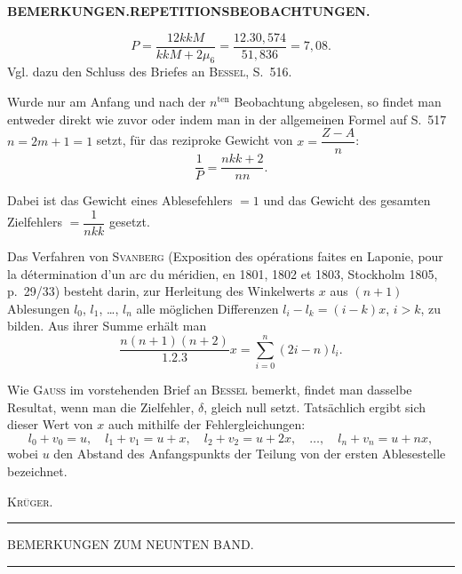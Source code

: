 \par\clearpage
\noindent{}\hfill{\small\textbf{BEMERKUNGEN.\quad REPETITIONSBEOBACHTUNGEN.}}\hfill\null\par\medskip
\[
 P=\frac{12kkM}{kkM+2\mu_6}=\frac{12.30{,}574}{51{,}836}=7{,}08.
\]
\indent Vgl. dazu den Schluss des Briefes an \textsc{Bessel}, S.~516.

Wurde nur am Anfang und nach der $n^{\text{ten}}$ Beobachtung abgelesen, so findet man entweder direkt wie zuvor oder indem man in der allgemeinen Formel auf S.~517 $n=2m+1=1$ setzt, für das reziproke Gewicht von $x=\dfrac{Z-A}{n}$:
\[
 \frac{1}{P}=\frac{nkk+2}{nn}.
\]

Dabei ist das Gewicht eines Ablesefehlers $=1$ und das Gewicht des gesamten Zielfehlers $=\dfrac{1}{nkk}$ gesetzt.

Das Verfahren von \textsc{Svanberg} (Exposition des opérations faites en Laponie, pour la détermination d'un arc du méridien, en 1801, 1802 et 1803, Stockholm 1805, p.~29/33) besteht darin, zur Herleitung des Winkelwerts $x$ aus $(n+1)$ Ablesungen $l_0$, $l_1$, \ldots, $l_n$ alle möglichen Differenzen $l_i-l_k=(i-k)x$, $i>k$, zu bilden. Aus ihrer Summe erhält man
\[
 \frac{n(n+1)(n+2)}{1.2.3}x=\sum_{i=0}^{n}(2i-n)l_i.
\]

Wie \textsc{Gauss} im vorstehenden Brief an \textsc{Bessel} bemerkt, findet man dasselbe Resultat, wenn man die Zielfehler, $\delta$, gleich null setzt. Tatsächlich ergibt sich dieser Wert von $x$ auch mithilfe der Fehlergleichungen:
\[
 l_0+v_0=u,\quad l_1+v_1=u+x,\quad l_2+v_2=u+2x,\quad \ldots,\quad l_n+v_n=u+nx,
\]
wobei $u$ den Abstand des Anfangspunkts der Teilung von der ersten Ablesestelle bezeichnet.\par
\hfill\textsc{Krüger.}\hspace*{\parindent}\par

\vspace{2.5cm}
\begin{center}\rule{4cm}{.4pt}\end{center}

\par\clearpage
\vspace*{.11\textheight}
\begin{center}
 {\Large BEMERKUNGEN ZUM NEUNTEN BAND.}\par
 \vspace{1em}
 \rule{1.5cm}{.4pt}
\end{center}
\vspace{1em}

